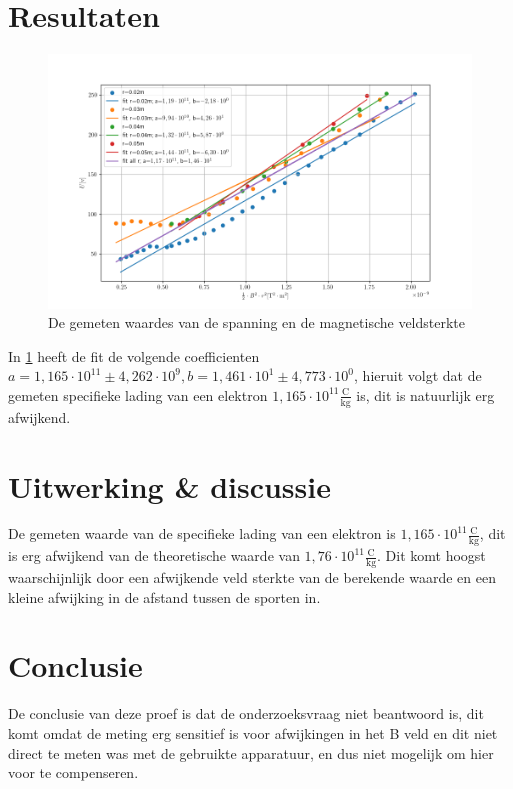 \documentclass{article}
\begin{document}
\section{Resultaten}

\begin{figure}[H]
	\centering
	\includegraphics[width=1\textwidth]{plot.png}
	\caption{De gemeten waardes van de spanning en de magnetische veldsterkte}
	\label{fig:plot}
\end{figure}
In \ref{fig:plot} heeft de fit de volgende coefficienten $a=1,165 \cdot 10^{11}\pm 4,262 \cdot 10^{9}, b=1,461 \cdot 10^{1}\pm 4,773 \cdot 10^{0}$, hieruit volgt dat de gemeten specifieke lading van een elektron $1,165 \cdot 10^{11} \mathrm{\frac{C}{kg}}$ is, dit is natuurlijk erg afwijkend.


\section{Uitwerking \& discussie}
De gemeten waarde van de specifieke lading van een elektron is $1,165 \cdot 10^{11} \mathrm{\frac{C}{kg}}$, dit is erg afwijkend van de theoretische waarde van $1,76 \cdot 10^{11} \mathrm{\frac{C}{kg}}$. Dit komt hoogst waarschijnlijk door een afwijkende veld sterkte van de berekende waarde en een kleine afwijking in de afstand tussen de sporten in.


\section{Conclusie}
De conclusie van deze proef is dat de onderzoeksvraag niet beantwoord is, dit komt omdat de meting erg sensitief is voor afwijkingen in het B veld en dit niet direct te meten was met de gebruikte apparatuur, en dus niet mogelijk om hier voor te compenseren. 
\end{document}
